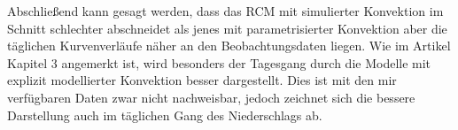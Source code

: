 \vspace{1pt}
Abschließend kann gesagt werden, dass das RCM mit simulierter Konvektion im Schnitt schlechter abschneidet als jenes mit parametrisierter Konvektion aber die täglichen Kurvenverläufe näher an den Beobachtungsdaten liegen. Wie im Artikel \cite{RCM} Kapitel 3 angemerkt ist, wird besonders der Tagesgang durch die Modelle mit explizit modellierter Konvektion  besser dargestellt. Dies ist mit den mir verfügbaren Daten zwar nicht nachweisbar, jedoch zeichnet sich die bessere Darstellung auch im täglichen Gang des Niederschlags ab.